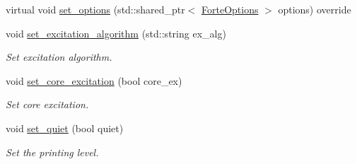 \begin{DoxyCompactItemize}
\item 
virtual void \mbox{\hyperlink{classforte_1_1_excited_state_solver_ac32716228ebaa1dfda75cf48db544e5f}{set\+\_\+options}} (std\+::shared\+\_\+ptr$<$ \mbox{\hyperlink{classforte_1_1_forte_options}{Forte\+Options}} $>$ options) override
\item 
void \mbox{\hyperlink{classforte_1_1_excited_state_solver_aa6a0c135e584b27da5ad2bc6bf6d9cc3}{set\+\_\+excitation\+\_\+algorithm}} (std\+::string ex\+\_\+alg)
\begin{DoxyCompactList}\small\item\em Set excitation algorithm. \end{DoxyCompactList}\item 
void \mbox{\hyperlink{classforte_1_1_excited_state_solver_a50494c293ba4bed55b8ce4c7585c93ee}{set\+\_\+core\+\_\+excitation}} (bool core\+\_\+ex)
\begin{DoxyCompactList}\small\item\em Set core excitation. \end{DoxyCompactList}\item 
void \mbox{\hyperlink{classforte_1_1_excited_state_solver_a17b7c4372d65beda0704a9fb94e358aa}{set\+\_\+quiet}} (bool quiet)
\begin{DoxyCompactList}\small\item\em Set the printing level. \end{DoxyCompactList}\end{DoxyCompactItemize}

